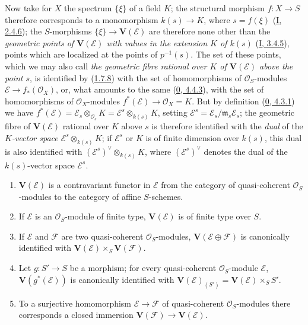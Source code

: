 \begin{env}[1.7.10]
\label{II.1.7.10}
Now take for $X$ the spectrum $\{\xi\}$ of a field $K$; the
structural morphism $f:X\to S$ therefore corresponds to a monomorphism
$k(s)\to K$, where $s=f(\xi)$
(\hyperref[I.2.4.6]{I, 2.4.6}); the $S$-morphisms
$\{\xi\}\to\mathbf{V}(\mathcal{E})$ are therefore none other than the
\emph{geometric points of $\mathbf{V}(\mathcal{E})$ with values in
the extension $K$ of $k(s)$} (\hyperref[I.3.4.5]{I, 3.4.5}), points
which are localized at the points of $p^{-1}(s)$. The set of these points,
which we may also call \emph{the geometric fibre rational over $K$ of
$\mathbf{V}(\mathcal{E})$ above the point $s$}, is identified by
(\hyperref[II.1.7.8]{1.7.8}) with the set of homomorphisms of
$\mathcal{O}_S$-modules
$\mathcal{E}\to f_*(\mathcal{O}_X)$, or, what amounts to the same
(\hyperref[0.4.4.3]{0, 4.4.3}), with the set of homomorphisms of
$\mathcal{O}_X$-modules
$f^*(\mathcal{E})\to\mathcal{O}_X=K$. But by definition
(\hyperref[0.4.3.1]{0, 4.3.1}) we have
$f^*(\mathcal{E})=\mathcal{E}_s\otimes_{\mathcal{O}_s}K
=\mathcal{E}^s\otimes_{k(s)}K$, setting
$\mathcal{E}^s=\mathcal{E}_s/\mathfrak{m}_s\mathcal{E}_s$; the geometric
fibre of $\mathbf{V}(\mathcal{E})$ rational over $K$ above
$s$ is therefore identified with the \emph{dual} of the \emph{$K$-vector
space $\mathcal{E}^s\otimes_{k(s)}K$}; if $\mathcal{E}^s$ or $K$ is of
finite dimension over $k(s)$, this dual is also identified with
$(\mathcal{E}^s)^\vee\otimes_{k(s)}K$, where
$(\mathcal{E}^s)^\vee$ denotes the dual of the $k(s)$-vector space
$\mathcal{E}^s$.
\end{env}

\begin{proposition}[1.7.11]
\label{II.1.7.11}
\begin{enumerate}
  \item[\rm(i)] $\mathbf{V}(\mathcal{E})$ is a contravariant functor in
    $\mathcal{E}$ from the category of quasi-coherent
    $\mathcal{O}_S$-modules to the category of affine $S$-schemes.
  \item[\rm(ii)] If $\mathcal{E}$ is an $\mathcal{O}_S$-module of finite
    type, $\mathbf{V}(\mathcal{E})$ is of finite type over $S$.
  \item[\rm(iii)] If $\mathcal{E}$ and $\mathcal{F}$ are two
    quasi-coherent $\mathcal{O}_S$-modules,
    $\mathbf{V}(\mathcal{E}\oplus\mathcal{F})$ is canonically identified
    with $\mathbf{V}(\mathcal{E})\times_S\mathbf{V}(\mathcal{F})$.
  \item[\rm(iv)] Let $g:S'\to S$ be a morphism; for every
    quasi-coherent $\mathcal{O}_S$-module $\mathcal{E}$,
    $\mathbf{V}(g^*(\mathcal{E}))$ is canonically identified with
    $\mathbf{V}(\mathcal{E})_{(S')}
    =\mathbf{V}(\mathcal{E})\times_S S'$.
  \item[\rm(v)] To a surjective homomorphism
    $\mathcal{E}\to\mathcal{F}$ of quasi-coherent $\mathcal{O}_S$-modules
    there corresponds a closed immersion
    $\mathbf{V}(\mathcal{F})\to\mathbf{V}(\mathcal{E})$.
\end{enumerate}
\end{proposition}

